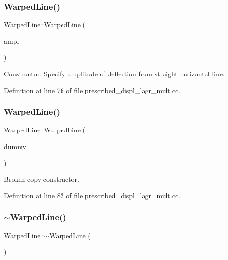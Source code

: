 \subsubsection{\texorpdfstring{Warped\+Line()}{WarpedLine()}\hspace{0.1cm}{\footnotesize\ttfamily [1/6]}}
{\footnotesize\ttfamily Warped\+Line\+::\+Warped\+Line (\begin{DoxyParamCaption}\item[{const double \&}]{ampl }\end{DoxyParamCaption})\hspace{0.3cm}{\ttfamily [inline]}}



Constructor\+: Specify amplitude of deflection from straight horizontal line. 



Definition at line 76 of file prescribed\+\_\+displ\+\_\+lagr\+\_\+mult.\+cc.

\mbox{\label{classWarpedLine_a53a7426303864ea2d34aeba0a3f6324f}} 
\subsubsection{\texorpdfstring{Warped\+Line()}{WarpedLine()}\hspace{0.1cm}{\footnotesize\ttfamily [2/6]}}
{\footnotesize\ttfamily Warped\+Line\+::\+Warped\+Line (\begin{DoxyParamCaption}\item[{const \hyperlink{classWarpedLine}{Warped\+Line} \&}]{dummy }\end{DoxyParamCaption})\hspace{0.3cm}{\ttfamily [inline]}}



Broken copy constructor. 



Definition at line 82 of file prescribed\+\_\+displ\+\_\+lagr\+\_\+mult.\+cc.

\mbox{\label{classWarpedLine_a4cb07fb7f06d42e2008afe65d8750cad}} 
\subsubsection{\texorpdfstring{$\sim$\+Warped\+Line()}{~WarpedLine()}\hspace{0.1cm}{\footnotesize\ttfamily [1/3]}}
{\footnotesize\ttfamily Warped\+Line\+::$\sim$\+Warped\+Line (\begin{DoxyParamCaption}{ }\end{DoxyParamCaption})\hspace{0.3cm}{\ttfamily [inline]}}



